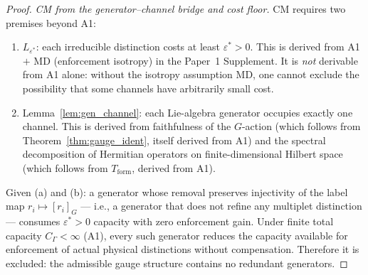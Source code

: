 \documentclass[11pt,a4paper]{article}
\theoremstyle{definition}
\begin{document}
\begin{proof}
\textit{CM from the generator--channel bridge and cost floor.}\quad
CM requires two premises beyond A1:
\begin{enumerate}[label=(\alph*),nosep]
  \item $L_{\varepsilon^*}$: each irreducible distinction costs at
  least $\varepsilon^* > 0$.  This is derived from A1 $+$ MD
  (enforcement isotropy) in the Paper~1 Supplement.  It is
  \emph{not} derivable from A1 alone: without the isotropy assumption
  MD, one cannot exclude the possibility that some channels have
  arbitrarily small cost.
  \item Lemma~\ref{lem:gen_channel}: each Lie-algebra generator
  occupies exactly one channel.  This is derived from faithfulness of
  the $G$-action (which follows from Theorem~\ref{thm:gauge_ident},
  itself derived from A1) and the spectral decomposition of Hermitian
  operators on finite-dimensional Hilbert space (which follows from
  $T_{\mathrm{form}}$, derived from A1).
\end{enumerate}
Given (a) and (b): a generator whose removal preserves injectivity
of the label map $r_i \mapsto [r_i]_G$ --- i.e., a generator that
does not refine any multiplet distinction --- consumes
$\varepsilon^* > 0$ capacity with zero enforcement gain.  Under
finite total capacity $C_\Gamma < \infty$ (A1), every such generator
reduces the capacity available for enforcement of actual physical
distinctions without compensation.  Therefore it is excluded: the
admissible gauge structure contains no redundant generators.
\end{proof}
\end{document}
